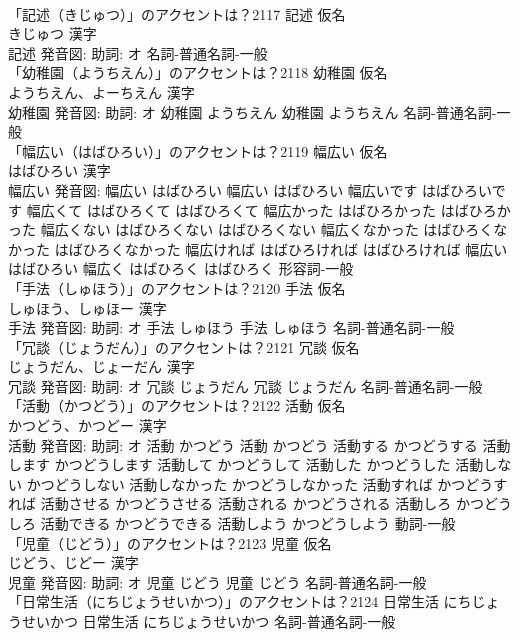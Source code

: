 \documentclass[8pt]{extreport}
\begin{document}
\begin{CJK}{UTF8}{min}
\\	「記述（きじゅつ）」のアクセントは？2117	記述 仮名　
\\	きじゅつ 漢字　
\\	記述 発音図: 助詞: オ							名詞-普通名詞-一般 
\\	「幼稚園（ようちえん）」のアクセントは？2118	幼稚園 仮名　
\\	ようちえん、よーちえん 漢字　
\\	幼稚園 発音図: 助詞: オ	幼稚園 ようちえん		幼稚園 ようちえん				名詞-普通名詞-一般 
\\	「幅広い（はばひろい）」のアクセントは？2119	幅広い 仮名　
\\	はばひろい 漢字　
\\	幅広い 発音図:	幅広い はばひろい		幅広い はばひろい 幅広いです はばひろいです 幅広くて はばひろくて はばひろくて 幅広かった はばひろかった はばひろかった 幅広くない はばひろくない はばひろくない 幅広くなかった はばひろくなかった はばひろくなかった 幅広ければ はばひろければ はばひろければ 幅広い はばひろい 幅広く はばひろく はばひろく				形容詞-一般 
\\	「手法（しゅほう）」のアクセントは？2120	手法 仮名　
\\	しゅほう、しゅほー 漢字　
\\	手法 発音図: 助詞: オ	手法 しゅほう		手法 しゅほう				名詞-普通名詞-一般 
\\	「冗談（じょうだん）」のアクセントは？2121	冗談 仮名　
\\	じょうだん、じょーだん 漢字　
\\	冗談 発音図: 助詞: オ	冗談 じょうだん		冗談 じょうだん				名詞-普通名詞-一般 
\\	「活動（かつどう）」のアクセントは？2122	活動 仮名　
\\	かつどう、かつどー 漢字　
\\	活動 発音図: 助詞: オ	活動 かつどう		活動 かつどう 活動する かつどうする 活動します かつどうします 活動して かつどうして 活動した かつどうした 活動しない かつどうしない 活動しなかった かつどうしなかった 活動すれば かつどうすれば 活動させる かつどうさせる 活動される かつどうされる 活動しろ かつどうしろ 活動できる かつどうできる 活動しよう かつどうしよう				動詞-一般 
\\	「児童（じどう）」のアクセントは？2123	児童 仮名　
\\	じどう、じどー 漢字　
\\	児童 発音図: 助詞: オ	児童 じどう		児童 じどう				名詞-普通名詞-一般 
\\	「日常生活（にちじょうせいかつ）」のアクセントは？2124		日常生活 にちじょうせいかつ		日常生活 にちじょうせいかつ				名詞-普通名詞-一般 

\end{CJK}
\end{document}
